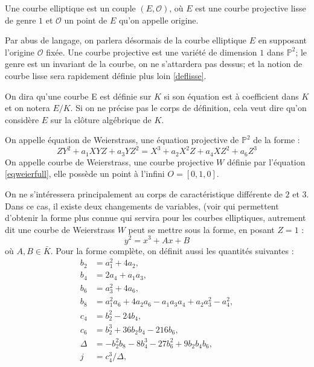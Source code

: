 \documentclass[a4paper]{article} %
\numberwithin{section}{part}
\numberwithin{equation}{section}
\newcommand\EO{\mathcal{O}}
\newcommand\PP[1]{\mathbb{P}^{#1}}
\begin{document}
\begin{defn}
Une courbe elliptique est un couple $(E, \EO)$, où $E$ est une courbe 
projective lisse de genre $1$ et $\EO$ un point de $E$ qu'on appelle origine.
\end{defn}

Par abus de langage, on parlera désormais de la courbe elliptique $E$ en
supposant l'origine $\EO$ fixée. Une courbe projective est une variété de
dimension $1$ dans $\PP{2}$; le genre est un invariant de la courbe, on ne
s'attardera pas dessus; et la notion de courbe lisse sera rapidement définie
plus loin \ref{deflisse}.\par
On dira qu'une courbe E est définie 
sur $K$ si son équation est à coefficient dans $K$ et on notera $E/K$. Si on ne
précise pas le corps de définition, cela veut dire qu'on considère $E$ sur la
clôture algébrique de $K$.

\begin{defn} 
On appelle équation de Weierstrass, une équation projective de $\PP{2}$ de la
forme :
\begin{equation}
\label{eqweierfull}
ZY^2 + a_1XYZ + a_3YZ^2 = X^3 + a_2X^2Z + a_4XZ^2 + a_6Z^3
\end{equation}
On appelle courbe de Weierstrass, une courbe projective $W$ définie par 
l'équation \ref{eqweierfull}, elle possède un point à l'infini $O = 
[0, 1, 0]$.
\end{defn}

On ne s'intéressera principalement au corps de caractéristique différente de $2$
et $3$. Dans ce cas, il existe deux changements de variables, (voir \cite[Chap. 
III,p.~42]{Sil} qui permettent d'obtenir la forme plus connue qui servira pour 
les courbes elliptiques, autrement dit une courbe de Weierstrass $W$ peut se 
mettre sous la forme, en posant $Z = 1$ :
\begin{equation}
\label{eqweiersimpl}
y^2 = x^3 + Ax + B
\end{equation}
où $A, B\in\bar{K}$. Pour la forme complète, on définit aussi les
quantités suivantes :
\begin{align*}
b_2 &= a_1^2 + 4a_2,\\
b_4 &= 2a_4 + a_1a_3,\\
b_6 &= a_3^2 + 4a_6,\\
b_8 &= a_1^2a_6 + 4a_2a_6 - a_1a_3a_4 + a_2a_3^2 - a_4^2,\\
c_4 &= b_2^2 - 24b_4,\\
c_6 &= b_2^3 + 36b_2b_4 - 216b_6,\\
\Delta &= -b_2^2b_8 - 8b_4^3 - 27b_6^2 + 9b_2b_4b_6,\\
j &= c_4^3/\Delta,\\
\end{align*}
\end{document}
